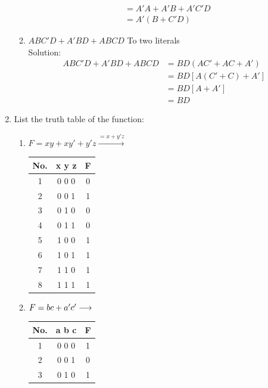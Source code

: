 \documentclass[a4paper,12pt]{article}
\begin{document}
\begin{enumerate}[label=\textbf{\arabic* .}]
\begin{enumerate}[label=\alph* .]
{\begin{align*}
           &= A'A+A'B+A'C'D\\
           &= A'(B+C'D)
        \end{align*}}
    \item $ABC'D + A'BD + ABCD$ \hspace{6.77cm} To two literals\\[0.3cm]
        {\color{blue} Solution:
        \begin{align*}
           ABC'D + A'BD + ABCD &= BD(AC'+AC+A')\\
           &= BD[A(C'+C)+A']\\
           &= BD[A+A']\\
           &= BD
        \end{align*}}
    \end{enumerate}
    \item List the truth table of the function:
        \begin{enumerate}[label=\alph* .]
        \item \textbf{$F =xy +xy'+y'z \xrightarrow{=x+y'z}$}
        {\color{blue}
        \begin{tabular}{|c|c|c|}
             \hline
             No.&x y z& F  \\
             \hline
             1&0 0 0& 0\\
             \hline
             2&0 0 1& 1\\
             \hline
             3&0 1 0& 0\\
             \hline
             4&0 1 1& 0\\
             \hline
             5&1 0 0& 1\\
             \hline
             6&1 0 1& 1\\
             \hline
             7&1 1 0& 1\\
             \hline
             8&1 1 1& 1\\
             \hline
        \end{tabular}}
        \item \textbf{$F=bc+a'c' \longrightarrow \hspace{1.65cm}$}
        {\color{blue}
        \begin{tabular}{|c|c|c|}
             \hline
             No.&a b c& F  \\
             \hline
             1&0 0 0& 1\\
             \hline
             2&0 0 1& 0\\
             \hline
             3&0 1 0& 1\\

\end{tabular}}
\end{enumerate}
\end{enumerate}
\end{document}
